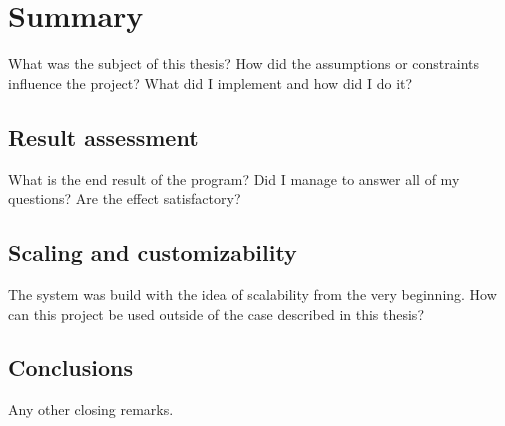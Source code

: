 \chapter{Summary}
\label{ch:summary}
What was the subject of this thesis?
How did the assumptions or constraints influence the project?
What did I implement and how did I do it?


\section{Result assessment}
What is the end result of the program?
Did I manage to answer all of my questions?
Are the effect satisfactory?


\section{Scaling and customizability}
The system was build with the idea of scalability from the very beginning.
How can this project be used outside of the case described in this thesis?


\section{Conclusions}
Any other closing remarks.